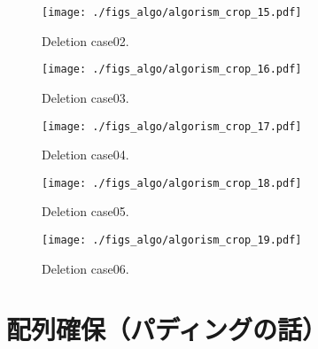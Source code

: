 \begin{figure}[h]
  \vspace{-0.5cm}
  \texttt{[image: ./figs\_algo/algorism\_crop\_15.pdf]}
  \caption{
    Deletion case02.
  }
  \label{fig_IpCHashT_deletion_case02}
  \vspace{-0.5cm}
\end{figure}

\begin{figure}[h]
  \vspace{-0.5cm}
  \texttt{[image: ./figs\_algo/algorism\_crop\_16.pdf]}
  \caption{
    Deletion case03.
  }
  \label{fig_IpCHashT_deletion_case03}
  \vspace{-0.5cm}
\end{figure}

\begin{figure}[h]
  \vspace{-0.5cm}
  \texttt{[image: ./figs\_algo/algorism\_crop\_17.pdf]}
  \caption{
    Deletion case04.
  }
  \label{fig_IpCHashT_deletion_case04}
  \vspace{-0.5cm}
\end{figure}

\begin{figure}[h]
  \vspace{-0.5cm}
  \texttt{[image: ./figs\_algo/algorism\_crop\_18.pdf]}
  \caption{
    Deletion case05.
  }
  \label{fig_IpCHashT_deletion_case05}
  \vspace{-0.5cm}
\end{figure}

\begin{figure}[h]
  \vspace{-0.5cm}
  \texttt{[image: ./figs\_algo/algorism\_crop\_19.pdf]}
  \caption{
    Deletion case06.
  }
  \label{fig_IpCHashT_deletion_case05}
  \vspace{-0.5cm}
\end{figure}

\section{配列確保（パディングの話）}









